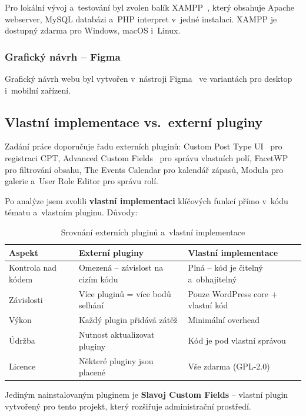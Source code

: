 \documentclass[12pt,a4paper]{article}
\begin{document}
Pro lokální vývoj a~testování byl zvolen balík XAMPP~\cite{xampp}, který obsahuje Apache webserver, MySQL databázi a~PHP interpret v~jedné instalaci. XAMPP je dostupný zdarma pro Windows, macOS i~Linux.

\subsubsection{Grafický návrh -- Figma}

Grafický návrh webu byl vytvořen v~nástroji Figma~\cite{figma} ve variantách pro desktop i~mobilní zařízení.

\subsection{Vlastní implementace vs.\ externí pluginy}

Zadání práce doporučuje řadu externích pluginů: Custom Post Type UI~\cite{cptui} pro registraci CPT, Advanced Custom Fields~\cite{acf} pro správu vlastních polí, FacetWP pro filtrování obsahu, The Events Calendar pro kalendář zápasů, Modula pro galerie a~User Role Editor pro správu rolí.

Po analýze jsem zvolili \textbf{vlastní implementaci} klíčových funkcí přímo v~kódu tématu a~vlastním pluginu. Důvody:

\begin{table}[H]
\centering
\begin{tabularx}{\textwidth}{l X X}
\toprule
\textbf{Aspekt} & \textbf{Externí pluginy} & \textbf{Vlastní implementace} \\
\midrule
Kontrola nad kódem & Omezená -- závislost na cizím kódu & Plná -- kód je čitelný a~obhajitelný \\
Závislosti & Více pluginů = více bodů selhání & Pouze WordPress core + vlastní kód \\
Výkon & Každý plugin přidává zátěž & Minimální overhead \\
Údržba & Nutnost aktualizovat pluginy & Kód je pod vlastní správou \\
Licence & Některé pluginy jsou placené & Vše zdarma (GPL-2.0) \\
\bottomrule
\end{tabularx}
\caption{Srovnání externích pluginů a~vlastní implementace}
\end{table}

Jediným nainstalovaným pluginem je \textbf{Slavoj Custom Fields} -- vlastní plugin vytvořený pro tento projekt, který rozšiřuje administrační prostředí.
\end{document}
